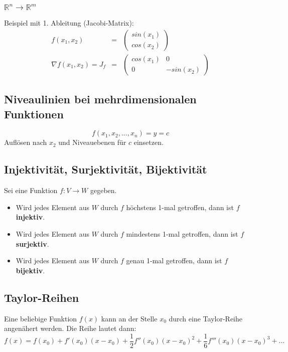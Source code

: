 \subsubsection{$\mathbb{R}^n \rightarrow \mathbb{R}^m$}
\label{ssub:rnrm}
Beispiel mit 1. Ableitung (Jacobi-Matrix): 
\begin{eqnarray*}
	f(x_1,x_2) &=& \left(\begin{array}{c} sin(x_1) \\ cos(x_2)\end{array}\right) \\
	\nabla f(x_1,x_2) = J_f &=& \left( \begin{array}{cc} cos(x_1) & 0 \\ 0 & -sin(x_2) \end{array} \right)
\end{eqnarray*}	

\subsection{Niveaulinien bei mehrdimensionalen Funktionen}
\label{sub:niveaulinien_bei_mehrdimensionalen_funktionen}

\begin{equation}
	f(x_1,x_2,...,x_n) = y = c
\end{equation}
Auflösen nach $x_2$ und Niveauebenen für $c$ einsetzen.

\subsection{Injektivit\"{a}t, Surjektivit\"{a}t, Bijektivit\"{a}t}
\label{sub:injektivitaet_surjektivitaet_bijektivitaet}

Sei eine Funktion $f : V \rightarrow W$ gegeben.

\begin{itemize}
	\item Wird jedes Element aus $W$ durch $f$ höchstens 1-mal getroffen, dann ist $f$ \textbf{injektiv}.
	\item Wird jedes Element aus $W$ durch $f$ mindestens 1-mal getroffen, dann ist $f$ \textbf{surjektiv}.
	\item Wird jedes Element aus $W$ durch $f$ genau 1-mal getroffen, dann ist $f$ \textbf{bijektiv}.
\end{itemize}

\subsection{Taylor-Reihen}
\label{sub:taylor_reihen}

Eine beliebige Funktion $f(x)$ kann an der Stelle $x_0$ durch eine Taylor-Reihe
angenähert werden. Die Reihe lautet dann: 
\begin{equation}
	f(x) = f(x_0) + f'(x_0)(x-x_0) + \frac{1}{2}f''(x_0)(x-x_0)^2 
	+ \frac{1}{6}f'''(x_0)(x-x_0)^3 + ...
\end{equation}
